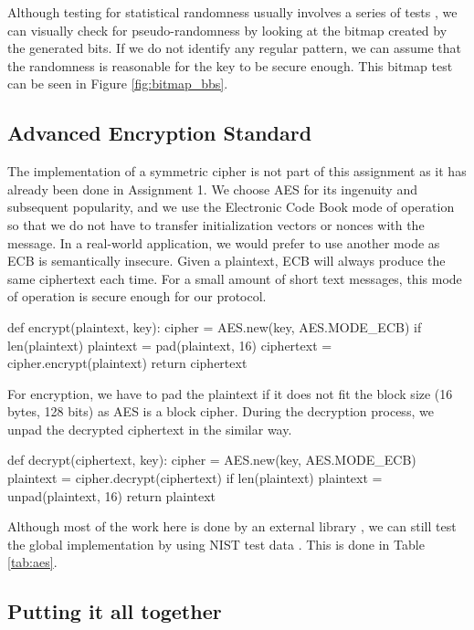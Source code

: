 \documentclass{article}
\begin{document}
Although testing for statistical randomness usually involves a series of tests \cite{rukhin2001statistical}, we can visually check for pseudo-randomness by looking at the bitmap created by the generated bits. If we do not identify any regular pattern, we can assume that the randomness is reasonable for the key to be secure enough. This bitmap test can be seen in Figure \ref{fig:bitmap_bbs}.

\subsection{Advanced Encryption Standard}

The implementation of a symmetric cipher is not part of this assignment as it has already been done in Assignment 1. We choose AES for its ingenuity and subsequent popularity, and we use the Electronic Code Book mode of operation so that we do not have to transfer initialization vectors or nonces with the message. In a real-world application, we would prefer to use another mode as ECB is semantically insecure. Given a plaintext, ECB will always produce the same ciphertext each time. For a small amount of short text messages, this mode of operation is secure enough for our protocol.
  
\bigskip
\begin{python}
def encrypt(plaintext, key):
    cipher = AES.new(key, AES.MODE_ECB)
    if len(plaintext) %
        plaintext = pad(plaintext, 16)
    ciphertext = cipher.encrypt(plaintext)
    return ciphertext
\end{python}
\bigskip

For encryption, we have to pad the plaintext if it does not fit the block size (16 bytes, 128 bits) as AES is a block cipher. During the decryption process, we unpad the decrypted ciphertext in the similar way. 

\bigskip
\begin{python}
def decrypt(ciphertext, key):
    cipher = AES.new(key, AES.MODE_ECB)
    plaintext = cipher.decrypt(ciphertext)
    if len(plaintext) %
        plaintext = unpad(plaintext, 16)
    return plaintext
\end{python}
\bigskip

Although most of the work here is done by an external library \cite{pycryptodome}, we can still test the global implementation by using NIST test data \cite{nist:test}. This is done in Table \ref{tab:aes}.

\subsection{Putting it all together}
\end{document}
